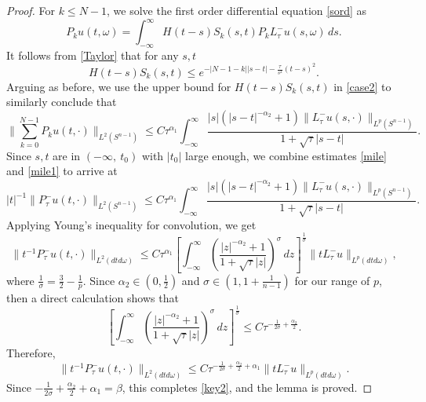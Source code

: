 \documentclass[11pt]{amsart}
\theoremstyle{plain}
\numberwithin{equation}{section}
\begin{document}
\begin{proof}
For $k\leq N-1$, we solve the first order differential equation
\eqref{sord} as
\begin{equation}
P_k u(t, \omega)=\int_{-\infty}^{\infty} H(t-s)S_k(s, t) P_k L^-_\tau u{\left( {s, {\omega}} \right) }\, ds
\label{star1}.
\end{equation}
It follows from \eqref{Taylor} that for any $s, t$
\begin{equation}
H(t-s) S_k(s, t)\leq e^{-|N- 1 - k  
||s-t|-\frac{\tau}{s^2}(t-s)^2}.
\label{case2}
\end{equation}
Arguing as before, we use the upper bound for $H(t-s)S_k(s,t)$ in \eqref{case2} 
to similarly conclude that
\begin{equation}
\| \sum_{k=0}^{N-1} P_k u(t, \cdot)\|_{L^2(S^{n-1})} \leq
C\tau^{\alpha_1} \int_{-\infty}^{\infty}
\frac{|s|(|s-t|^{-\alpha_2}+1)\| L^-_\tau u(s, \cdot)
\|_{L^p(S^{n-1})}}{1+\sqrt{\tau}|s-t|}.
\label{mile1}
\end{equation}
Since $s,t $ are in $(-\infty, \ t_0)$ with $|t_0|$ large enough, we combine estimates \eqref{mile} and \eqref{mile1} to arrive at
\begin{equation*}
|t|^{-1}\| P_\tau^- u(t, \cdot)\|_{L^2(S^{n-1})} \leq C
\tau^{\alpha_1} \int_{-\infty}^{\infty}
\frac{|s|(|s-t|^{-\alpha_2}+1)\| L^-_\tau u(s, \cdot)
\|_{L^p(S^{n-1})}}{1+\sqrt{\tau}|s-t|}.
\end{equation*}
Applying Young's inequality for convolution, we get
\begin{equation*}
\| t^{-1} P_\tau^- u (t, \cdot) \|_{L^2(dtd\omega)}
\leq C\tau^{\alpha_1} {\left[{\int_{-\infty}^{\infty} {\left( {\frac{ |z|^{-\alpha_2}+1} {1+\sqrt{\tau}|z|}} \right) }^{\sigma} \, dz}\right]}^{\frac{1}{\sigma}} \| tL^-_\tau u \|_{L^p(dtd\omega)},
\end{equation*}
where $\frac{1}{\sigma}=\frac{3}{2}-\frac{1}{p}$.
Since ${\alpha}_2 \in {\left( {0, \frac 1 2} \right) }$ and ${\sigma} \in {\left( {1, 1 + \frac 1 {n-1}} \right) }$ for our
range of $p$, then a direct calculation shows that
$${\left[{\int_{-\infty}^{\infty} {\left( {\frac{ |z|^{-\alpha_2}+1} {1+\sqrt{\tau}|z|}} \right) }^{\sigma} \, dz}\right]}^{\frac{1}{\sigma}} \leq C\tau^{-\frac{1}{2{\sigma}}+\frac{\alpha_2}{2}}.
$$
 Therefore,
\begin{equation*}
\| t^{-1} P_\tau^- u (t, \cdot) \|_{L^2(dtd\omega)}\leq
C\tau^{-\frac{1}{2{\sigma}}+\frac{\alpha_2}{2}+\alpha_1} \| t L^-_\tau
u \|_{L^p(dtd\omega)}.
\end{equation*}
Since
$-\frac{1}{2{\sigma}}+\frac{\alpha_2}{2}+\alpha_1=\beta$,
this completes \eqref{key2}, and the lemma is proved.
\end{proof}
\end{document}

